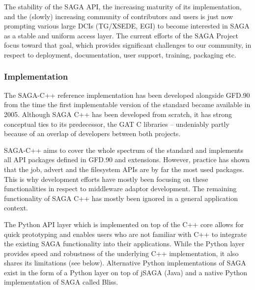 \documentclass{article}
\begin{document}
  The stability of the SAGA API, the increasing maturity of its
  implementation, and the (slowly) increasing community of contributors
  and users is just now prompting various large DCIs (TG/XSEDE, EGI) to
  become interested in SAGA as a stable and uniform access layer.  The
  current efforts of the SAGA Project focus toward that goal, which
  provides significant challenges to our community, in respect to
  deployment, documentation, user support, training, packaging
  etc. 

  \subsubsection{Implementation}

   The SAGA-C++ reference implementation has been developed alongside
   GFD.90 from the time the first implementable version of the standard
   became available in 2005. Although SAGA C++ has been developed from
   scratch, it has strong conceptual ties to its predecessor, the GAT
   C libraries -- undeniably partly because of an overlap of developers
   between both projects.

   SAGA-C++ aims to cover the whole spectrum of the standard and
   implements all API packages defined in GFD.90 and extensions.
   However, practice has shown that the job, advert and the filesystem
   APIs are by far the most used packages.  
   This is why development efforts have mostly been focusing
   on these functionalities in respect to middleware adaptor
   development. The remaining functionality of SAGA C++ has mostly 
   been ignored in a general application context.
     
   The Python API layer which is implemented on top of the C++ core
   allows for quick prototyping and enables users who are not familiar
   with C++ to integrate the existing SAGA functionality into their
   applications. While the Python layer provides speed and robustness 
   of the underlying C++ implementation, it also shares its limitations
   (see below). Alternative Python implementations of SAGA exist in 
   the form of a Python layer on top of jSAGA (Java) and a native Python
   implementation of SAGA called Bliss\cite{bliss_web}.

   
\end{document}
